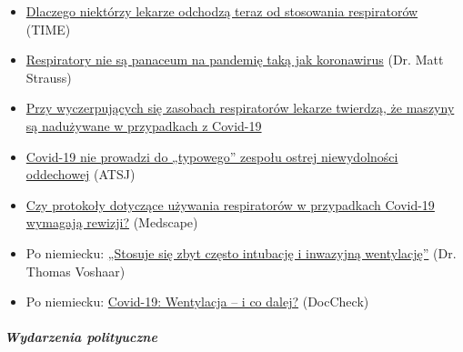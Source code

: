 \begin{itemize}
\tightlist
\item
  \href{https://time.com/5818547/ventilators-coronavirus/}{Dlaczego
  niektórzy lekarze odchodzą teraz od stosowania respiratorów} (TIME)
\item
  \href{https://www.spectator.co.uk/article/Ventilators-aren-t-a-panacea-for-a-pandemic-like-coronavirus}{Respiratory
  nie są panaceum na pandemię taką jak koronawirus} (Dr. Matt Strauss)
\item
  \href{https://www.statnews.com/2020/04/08/doctors-say-ventilators-overused-for-covid-19/}{Przy
  wyczerpujących się zasobach respiratorów lekarze twierdzą, że maszyny
  są nadużywane w przypadkach z Covid-19}
\item
  \href{https://www.atsjournals.org/doi/pdf/10.1164/rccm.202003-0817LE}{Covid-19
  nie prowadzi do „typowego'' zespołu ostrej niewydolności oddechowej}
  (ATSJ)
\item
  \href{https://www.medscape.com/viewarticle/928156}{Czy protokoły
  dotyczące używania respiratorów w przypadkach Covid-19 wymagają
  rewizji?} (Medscape)
\item
  Po niemiecku: \href{https://archive.is/KX5IQ}{„Stosuje się zbyt często
  intubację i inwazyjną wentylację''} (Dr. Thomas Voshaar)
\item
  Po niemiecku:
  \href{https://www.doccheck.com/de/detail/articles/26271-covid-19-beatmung-und-dann}{C}\href{https://www.doccheck.com/de/detail/articles/26271-covid-19-beatmung-und-dann}{ovid-19:
  Wentylacja -- i co dalej?} (DocCheck)
\end{itemize}

\hypertarget{wydarzenia-polityuczne}{%
\subparagraph{\texorpdfstring{\textbf{Wydarzenia
polityuczne}}{Wydarzenia polityuczne}}\label{wydarzenia-polityuczne}}


